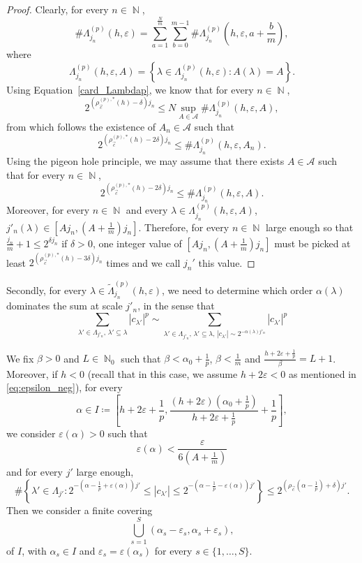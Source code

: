\documentclass[a4paper,11pt,oneside]{article}
\DeclareMathOperator{\N}{\mathbb{N}}
\newcommand{\ccint}[1]{\left[{#1}\right]}
\newcommand{\ooint}[1]{\left({#1}\right)}
\newcommand{\modu}[1]{\left\vert{#1}\right\vert}
\theoremstyle{definition}
\theoremstyle{plain}
\begin{document}
\begin{proof}
Clearly, for every $n\in\N$,
\[
\#\Lambda_{j_n}^{(p)}(h,\varepsilon) = \sum_{a=1}^{\frac{N}{m}}\sum_{b=0}^{m-1}\#\Lambda^{(p)}_{j_n}\left(h,\varepsilon,a+\frac{b}{m}\right),
\]
where
\[
\Lambda_{j_n}^{(p)}(h,\varepsilon,A)=\left\{\lambda\in\Lambda_{j_n}^{(p)}(h,\varepsilon):A(\lambda)=A\right\}.
\]
Using Equation~\eqref{card_Lambdap}, we know that for every $n\in\N$,
\[
2^{(\rho_{\vec{c}}^{(p),\ast}(h)-\delta)j_n}\leq N\sup_{A\in\mathcal{A}}\#\Lambda_{j_n}^{(p)}(h,\varepsilon,A),
\]
from which follows the existence of $A_n\in\mathcal{A}$ such that
\[
2^{(\rho_{\vec{c}}^{(p),\ast}(h)-2\delta)j_n}\leq\#\Lambda_{j_n}^{(p)}(h,\varepsilon,A_n).
\]
Using the pigeon hole principle, 
we may assume that there exists $A\in\mathcal{A}$ such that for every $n\in\N$, 
\[
2^{(\rho_{\vec{c}}^{(p),\ast}(h)-2\delta)j_n}\leq \#\Lambda_{j_n}^{(p)}(h,\varepsilon,A).
\]
Moreover, for every $n\in\N$ and every 
$\lambda\in\Lambda_{j_n}^{(p)}(h,\varepsilon,A)$, $j'_n(\lambda)\in\ccint{Aj_n,\left(A+\frac{1}{m}\right)j_n}$. Therefore, for every $n\in\N$ large enough so that $\frac{j_n}{m}+1\leq 2^{\delta j_n}$ if $\delta>0$, one integer value of $\ccint{Aj_n,\left(A+\frac{1}{m}\right)j_n}$ must be picked at least $2^{(\rho_{\vec{c}}^{(p),\ast}(h)-3\delta)j_n}$ times and we call $j_n'$ this value.
\end{proof}

\medskip

Secondly, for every $\lambda\in\widetilde{\Lambda}_{j_n}^{(p)}(h,\varepsilon)$, we need to determine which order $\alpha(\lambda)$ dominates the sum at scale $j'_n$, in the sense that 
\[
\sum_{\lambda'\in\Lambda_{j'_n},\,\lambda'\subseteq\lambda}\modu{c_{\lambda'}}^p\sim\sum_{\lambda'\in\Lambda_{j'_n},\,\lambda'\subseteq\lambda,\,\modu{c_{\lambda'}}\sim 2^{-\alpha(\lambda)j'_n}}\modu{c_{\lambda'}}^p
\]

We fix $\beta>0$ and $L\in\N_0$ such that $\beta<\alpha_0+\frac{1}{p}$, $\beta<\frac{1}{m}$ and $\frac{h+2\varepsilon+\frac{1}{p}}{\beta}=L+1$. Moreover, if $h<0$ (recall that in this case, we assume $h+2\varepsilon<0$ as mentioned in \eqref{eq:epsilon_neg}), for every 
\[
\alpha\in I\coloneqq\ccint{h+2\varepsilon+\frac{1}{p},\frac{(h+2\varepsilon)\left(\alpha_0+\frac{1}{p}\right)}{h+2\varepsilon+\frac{1}{p}}+\frac{1}{p}},
\]
we consider $\varepsilon(\alpha)>0$ such that 
\begin{equation}\label{eq:epsilon_s1}
    \varepsilon(\alpha)<\frac{\varepsilon}{6\left(A+\frac{1}{m}\right)}
\end{equation}
and for every $j'$ large enough,
\begin{equation}\label{eq:epsilon_s2}
    \#\left\{\lambda'\in\Lambda_{j'}:2^{-\left(\alpha-\frac{1}{p}+\varepsilon(\alpha)\right)j'} \leq \modu{c_{\lambda'}} \leq 2^{-\left(\alpha-\frac{1}{p}-\varepsilon(\alpha)\right)j'}\right\} \leq 2^{\left(\rho_{\vec{c}}\left(\alpha-\frac{1}{p}\right)+\delta\right)j'}.
\end{equation}
Then we consider a finite covering
\[
\bigcup_{s=1}^S\ooint{\alpha_s-\varepsilon_s,\alpha_s+\varepsilon_s},
\]
of $I$, with $\alpha_s\in I$ and $\varepsilon_s=\varepsilon(\alpha_s)$ for every $s\in\{1,\ldots,S\}$.
\end{document}
